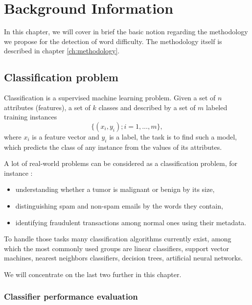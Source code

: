 \chapter{Background Information}
\label{ch:background-information}

In this chapter, we will cover in brief the basic notion regarding the methodology we propose for the detection of word difficulty. The methodology itself is described in chapter \ref{ch:methodology}.

\section{Classification problem}
Classification is a supervised machine learning problem. Given a set
of $n$ attributes (features), a set of $k$ classes and described by a set of $m$ labeled training instances $$\{(x_i,y_i); i=1,...,m\},$$ where $x_i$
is a feature vector and $y_i$  is a label, the task is to find such a
model, which predicts the class of any instance from the values of its attributes.

A lot of real-world problems can be considered as a classification problem, for instance \citep{Ng-2012cs229}:
\begin{itemize}
    \item understanding whether a tumor is malignant or benign by its size,
    \item distinguishing spam and non-spam emails by the words they contain,
    \item identifying fraudulent transactions among normal ones using their metadata.
\end{itemize}
To handle those tasks many classification algorithms currently exist, among which the most commonly used groups are linear classifiers, support vector machines, nearest neighbors classifiers, decision trees, artificial neural networks.

We will concentrate on the last two further in this chapter.

\subsection{Classifier performance evaluation}
\label{sec:clf-eval}

